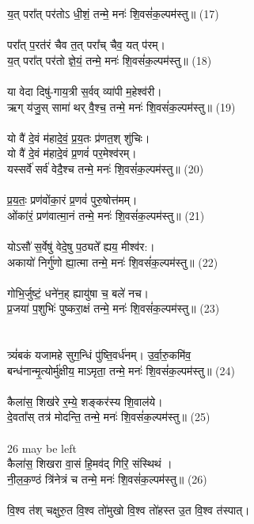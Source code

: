य॒त् परा᳚त् पर॑तोऽ धी॒शं॒ तन्मे॒ मनः॑ शि॒वसं॑क॒ल्पम॑स्तु॥ (17)\\
\\
परा᳚त् प॒रत॑रं चैव त॒त् परा᳚च् चैव॒ यत् प॑रम्। \\
य॒त् परा᳚त् पर॑तो ज्ञे॒यं॒ तन्मे॒ मनः॑ शि॒वसं॑क॒ल्पम॑स्तु॥ (18)\\
\\
या वेदा दिषु॑-गाय॒त्री स॒र्वव् व्या॑पी म॒हेश्व॑री। \\
ऋग् य॑जु॒स् सामा॑ थर् वै॒श्च॒ तन्मे॒ मनः॑ शि॒वसं॑क॒ल्पम॑स्तु॥ (19)\\
\\
यो वै॑ दे॒वं म॑हादे॒वं॒ प्र॒य॒तः प्र॑णत॒श् शु॑चिः। \\
{\small यो वै॑ दे॒वं म॑हादे॒वं प्र॒णवं॑ पर॒मेश्व॑रम्।}\\
यस्सर्वे॑ सर्व॑ वेदै॒श्च तन्मे॒ मनः॑ शि॒वसं॑क॒ल्पम॑स्तु॥ (20)\\
\\
प्र॒य॒तः॒ प्रण॑वोंका॒रं प्र॒णवं॑ पुरु॒षोत्त॑मम्। \\
ओंका॑रं॒ प्रण॑वात्मा॒नं तन्मे॒ मनः॑ शि॒वसं॑क॒ल्पम॑स्तु॥ (21)\\
\\
योऽसौ॑ स॒र्वेषु॑ वेदे॒षु प॒ठ्यते᳚ ह्यय॒ मीश्व॑र:। \\
अकायो॑ निर्गु॑णो ह्या॒त्मा तन्मे॒ मनः॑ शि॒वसं॑क॒ल्पम॑स्तु॥ (22)\\
\\
गोभि॒र्जुष्टं॒ धने॑न॒ह् ह्यायु॑षा च॒ बले॑ नच। \\
प्र॒जया॑ प॒शुभिः॑ पुष्करा॒क्षं तन्मे॒ मनः॑ शि॒वसं॑क॒ल्पम॑स्तु॥ (23)\\
\\
{\small {}}\\
त्र्यं॑बकं यजामहे सुग॒न्धिं पु॑ष्ति॒वर्ध॑नम्। उ॒र्वा॒रु॒कमि॑व॒ \\
बन्ध॑नान्मृ॒त्योर्मु॑क्षीय॒ माऽमृता॒ तन्मे॒ मनः॑ शि॒वसं॑क॒ल्पम॑स्तु॥ (24)\\
\\
कैला॑स॒ शिख॑रे र॒म्ये॒ शङ्कर॑स्य शि॒वाल॑ये। \\
दे॒वता᳚स् तत्र॑ मोदन्ति॒ तन्मे॒ मनः॑ शि॒वसं॑क॒ल्पम॑स्तु॥ (25)\\
\\
{\small 26 may be left}\\
कैला॑स॒ शिखरा वा॒सं हि॒मव॑द् गिरि॒ संस्थिथं । \\
नी॒ल॒क॒ण्ठं त्रि॑नेत्रं च तन्मे॒ मनः॑ शि॒वसं॑क॒ल्पम॑स्तु॥ (26)\\
\\
वि॒श्व त॑श् चक्षुरु॒त वि॒श्व तो॑मुखो वि॒श्व तो॑हस्त उ॒त वि॒श्व त॑स्पात्।\\
